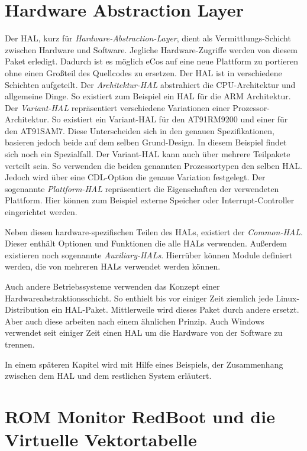 \documentclass[
  a4paper,					%
  twoside,
  DIV=calc,     				%
  bibliography=totoc,
  cleardoublepage=empty,
  ngerman,     					%
  final       					%
]{scrbook}
\begin{document}
\section{Hardware Abstraction Layer}
\label{sec:HAL}
Der HAL, kurz für \emph{Hardware-Abstraction-Layer}, dient als Vermittlungs-Schicht zwischen Hardware und Software. Jegliche Hardware-Zugriffe werden von diesem Paket erledigt. Dadurch ist es möglich eCos auf eine neue Plattform zu portieren ohne einen Großteil des Quellcodes zu ersetzen. Der HAL ist in verschiedene Schichten aufgeteilt. Der \emph{Architektur-HAL} abstrahiert die CPU-Architektur und allgemeine Dinge. So existiert zum Beispiel ein HAL für die ARM Architektur. Der \emph{Variant-HAL} repräsentiert verschiedene Variationen einer Prozessor-Architektur. So existiert ein Variant-HAL für den AT91RM9200 und einer für den AT91SAM7. Diese Unterscheiden sich in den genauen Spezifikationen, basieren jedoch beide auf dem selben Grund-Design. In diesem Beispiel findet sich noch ein Spezialfall. Der Variant-HAL kann auch über mehrere Teilpakete verteilt sein. So verwenden die beiden genannten Prozessortypen den selben HAL. Jedoch wird über eine CDL-Option die genaue Variation festgelegt. Der sogenannte \emph{Plattform-HAL} repräsentiert die Eigenschaften der verwendeten Plattform. Hier können zum Beispiel externe Speicher oder Interrupt-Controller eingerichtet werden.

Neben diesen hardware-spezifischen Teilen des HALs, existiert der \emph{Common-HAL}. Dieser enthält Optionen und Funktionen die alle HALs verwenden. Außerdem existieren noch sogenannte \emph{Auxiliary-HALs}. Hierrüber können Module definiert werden, die von mehreren HALs verwendet werden können.

Auch andere Betriebssysteme verwenden das Konzept einer Hardwareabstraktionsschicht. So enthielt bis vor einiger Zeit ziemlich jede Linux-Distribution ein HAL-Paket. Mittlerweile wird dieses Paket durch andere ersetzt. Aber auch diese arbeiten nach einem ähnlichen Prinzip. Auch Windows verwendet seit einiger Zeit einen HAL um die Hardware von der Software zu trennen.

In einem späteren Kapitel wird mit Hilfe eines Beispiels, der Zusammenhang zwischen dem HAL und dem restlichen System erläutert.




\section{ROM Monitor RedBoot und die Virtuelle Vektortabelle}
\label{sec:ROM_Monitor}
\end{document}
